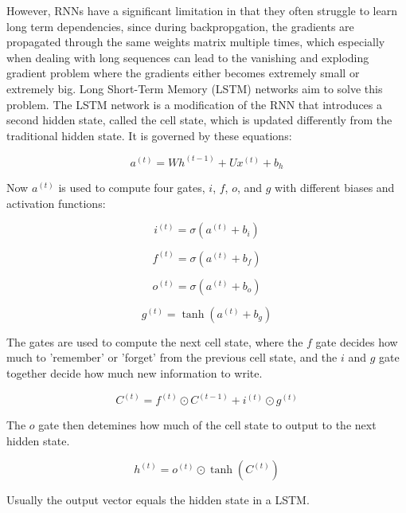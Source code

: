 \documentclass[11pt]{article}
\begin{document}
However, RNNs have a significant limitation in that they often struggle to learn long term dependencies, since during backpropgation, the gradients are propagated through the same weights matrix multiple times, which especially when dealing with long sequences can lead to the vanishing and exploding gradient problem where the gradients either becomes extremely small or extremely big. Long Short-Term Memory (LSTM) networks  aim to solve this problem. The LSTM network is a modification of the RNN that introduces a second hidden state, called the cell state, which is updated differently from the traditional hidden state. It is governed by these equations:

\begin{equation} a^{(t)} = Wh^{(t-1)} + Ux^{(t)} + b_h\end{equation}

Now $a^{(t)}$ is used to compute four gates, $i$, $f$, $o$, and $g$ with different biases and activation functions:

\begin{equation} i^{(t)} = \sigma(a^{(t)} + b_i) \end{equation}

\begin{equation} f^{(t)} = \sigma(a^{(t)} + b_f) \end{equation}

\begin{equation} o^{(t)} = \sigma(a^{(t)} + b_o) \end{equation}

\begin{equation} g^{(t)} = \tanh(a^{(t)} + b_g) \end{equation}

The gates are used to compute the next cell state, where the $f$ gate decides how much to 'remember' or 'forget' from the previous cell state, and the $i$ and $g$ gate together decide how much new information to write.

\begin{equation} C^{(t)} = f^{(t)} \odot C^{(t-1)} + i^{(t)} \odot g^{(t)} \end{equation}

The $o$ gate then detemines how much of the cell state to output to the next hidden state.

\begin{equation} h^{(t)} = o^{(t)} \odot \tanh(C^{(t)}) \end{equation}

Usually the output vector equals the hidden state in a LSTM.
\end{document}
